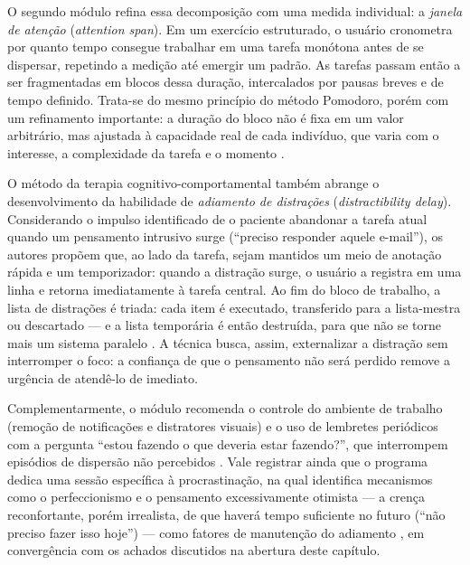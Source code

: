 \documentclass[12pt, %
openright, 
oneside,
a4paper,
english,   %
brazil]{facom-ufu-abntex2}
\begin{document}
O segundo módulo refina essa decomposição com uma medida individual: a
\textit{janela de atenção} (\textit{attention span}). Em um exercício
estruturado, o usuário cronometra por quanto tempo consegue trabalhar em uma
tarefa monótona antes de se dispersar, repetindo a medição até emergir um
padrão. As tarefas passam então a ser fragmentadas em blocos dessa duração,
intercalados por pausas breves e de tempo definido. Trata-se do mesmo
princípio do método Pomodoro, porém com um refinamento importante: a duração
do bloco não é fixa em um valor arbitrário, mas ajustada à capacidade real de
cada indivíduo, que varia com o interesse, a complexidade da tarefa e o
momento \cite{SafrenMasteringADHD}.

O método da terapia cognitivo-comportamental também abrange o desenvolvimento
da habilidade de \textit{adiamento de distrações} (\textit{distractibility
delay}). Considerando o impulso identificado de o paciente abandonar a tarefa
atual quando um pensamento intrusivo surge (``preciso responder aquele
e-mail''), os autores propõem que, ao lado da tarefa, sejam mantidos um meio
de anotação rápida e um temporizador: quando a distração surge, o usuário a
registra em uma linha e retorna imediatamente à tarefa central. Ao fim do
bloco de trabalho, a lista de distrações é triada: cada item é executado,
transferido para a lista-mestra ou descartado --- e a lista temporária é então
destruída, para que não se torne mais um sistema paralelo
\cite{SafrenMasteringADHD}. A técnica busca, assim, externalizar a distração
sem interromper o foco: a confiança de que o pensamento não será perdido
remove a urgência de atendê-lo de imediato.

Complementarmente, o módulo recomenda o controle do ambiente de trabalho
(remoção de notificações e distratores visuais) e o uso de lembretes
periódicos com a pergunta ``estou fazendo o que deveria estar fazendo?'', que
interrompem episódios de dispersão não percebidos \cite{SafrenMasteringADHD}.
Vale registrar ainda que o programa dedica uma sessão específica à
procrastinação, na qual identifica mecanismos como o perfeccionismo e o
pensamento excessivamente otimista --- a crença reconfortante, porém
irrealista, de que haverá tempo suficiente no futuro (``não preciso fazer isso
hoje'') --- como fatores de manutenção do adiamento \cite{KnouseMitchell2015},
em convergência com os achados discutidos na abertura deste capítulo.
\end{document}
